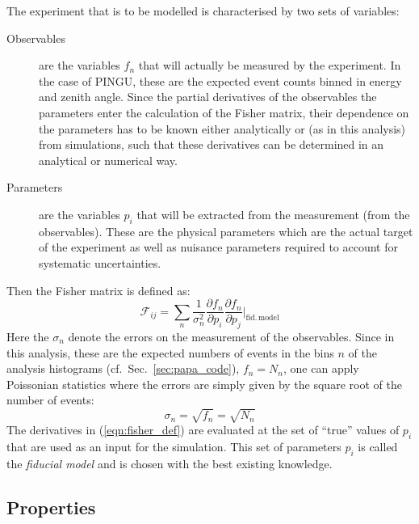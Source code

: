 The experiment that is to be modelled is characterised by two sets of variables:
\begin{description}
 \item[Observables] are the variables $f_n$ that will actually be measured by
  the experiment. In the case of PINGU, these are the expected event counts 
  binned in energy and zenith angle. Since the partial derivatives of the
  observables \wrt the parameters enter the calculation of the Fisher matrix,
  their dependence on the parameters has to be known either analytically or (as
  in this analysis) from simulations, such that these derivatives can be
  determined in an analytical or numerical way.
 \item[Parameters] are the variables $p_i$ that will be extracted from the
  measurement (\ie from the observables). These are the physical parameters
  which are the actual target of the experiment as well as nuisance parameters
  required to account for systematic uncertainties.
\end{description}
Then the Fisher matrix is defined as:
\begin{equation}
 \mathcal{F}_{ij} = \sum_n \frac{1}{\sigma_n^2} \frac{\partial f_n}{\partial
p_i} \frac{\partial f_n}
 {\partial p_j}\bigg|_\mathrm{fid.\,model}
 \label{eqn:fisher_def}
\end{equation}
Here the $\sigma_n$ denote the errors on the measurement of the observables.
Since in this analysis, these are the expected numbers of events in the bins $n$
of the analysis histograms (cf.\ Sec.~\ref{sec:papa_code}), $f_n = N_n$, one
can apply Poissonian statistics where the errors are simply given by the square
root of the number of events:
\begin{equation}
 \sigma_n = \sqrt{f_n} = \sqrt{N_n}
\end{equation}
The derivatives in (\ref{eqn:fisher_def}) are evaluated at the set of ``true''
values of $p_i$ that are used as an input for the simulation. This set of
parameters $p_i$ is called the \emph{fiducial model} and is chosen with the best
existing knowledge.

\subsection{Properties}

